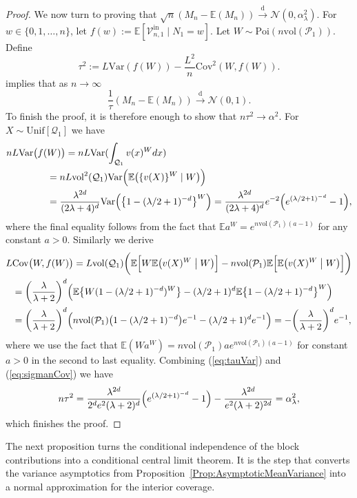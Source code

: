 \documentclass[11pt]{article}
\newcommand{\E}{\mathbb{E}}
\newcommand{\mQ}{\mathcal{Q}}
\newcommand{\vol}{\mathrm{vol}}
\newcommand{\var}{\mathrm{Var}}
\newcommand{\cov}{\mathrm{Cov}}
\newcommand{\dto}{\xrightarrow{\,\mathrm{d}\,} }
\begin{document}
\begin{proof}
We now turn to proving that $\sqrt{n}(M_n - \E(M_n))\dto \mathcal{N}(0, \alpha_\lambda^2)$. For $w\in \{0, 1, \ldots, n\}$, let $f(w) := \E[\mathcal{V}_{n, 1}^{\mathrm{in}}\mid N_1 = w]$. Let $W\sim\mathrm{Poi}(n\vol(\mathcal{P}_1))$. Define
\[
\tau^2 := L\var(f(W)) - \frac{L^2}{n}\cov^2(W, f(W)).
\]
\citet[Theorem~1]{holst1972asymptotic} implies that as $n \to \infty$
\[
\frac{1}{\tau}(M_n - \E(M_n)) \dto \mathcal{N}(0, 1). 
\]
To finish the proof, it is therefore enough to show that $n\tau^2\to \alpha^2$. For $X\sim\mathrm{Unif}[\mQ_1]$ we have
\begin{align}
    n L \var \bigl(f(&W)\bigr) = n L \var(\int_{\mQ_1}v(x)^W dx)\notag\\
    &= n L \vol^2(\mathcal{Q}_1)\var\Bigl(\E\bigl(\{v(X)\}^{W}\mid W\bigr)\Bigr) \notag \\
    &= \frac{\lambda^{2d}}{(2\lambda + 4)^{d}}\var\Bigl(\bigl\{1 - (\lambda/2 + 1)^{-d}\bigr\}^{W}\Bigr) 
    = \frac{\lambda^{2d}}{(2\lambda + 4)^{d}} e^{-2} \Bigl( e^{(\lambda/2 + 1)^{-d}} - 1\Bigr),\label{eq:tauVar} 
\end{align}
where the final equality follows from the fact that $\E a^W = e^{n\vol(\mathcal{P}_1)(a - 1)}$ for any constant $a > 0$. Similarly we derive
\begin{align}
L &\mathrm{Cov}\bigl(W, f(W)\bigr)= L\vol(\mathcal{Q}_1)\biggl(\E \Bigl[W \E\bigl(v(X)^{W}\bigm|W\bigr)\Bigr] -  n\vol(\mathcal{P}_1)\E\Bigl[\E\bigl(v(X)^{W}\bigm|W\bigr)\Bigr]\biggr) \notag \\ 
&=\biggl(\frac{\lambda}{\lambda + 2}\biggr)^d \Bigl(\E\bigl\{W(1 - (\lambda/2 + 1)^{-d})^{W}\bigr\} - (\lambda/2 + 1)^d \E\bigl\{1 - (\lambda/2 + 1)^{-d}\bigr\}^W\Bigr) \notag \\
&= \biggl(\frac{\lambda}{\lambda + 2}\biggr)^d\Bigl(n\vol(\mathcal{P}_1)\bigl(1 - (\lambda/2 + 1)^{-d}\bigr)e^{-1} 
 - (\lambda/2 + 1)^d e^{-1}\Bigr) = -\biggl(\frac{\lambda}{\lambda + 2}\biggr)^d e^{-1} \label{eq:sigmanCov},
\end{align}
where we use the fact that  $\E (W a^W) =  n\vol(\mathcal{P}_1) a e^{n\vol(\mathcal{P}_1)(a - 1)}$ for constant $a > 0$ in the second to last equality. Combining (\ref{eq:tauVar}) and (\ref{eq:sigmanCov}) we have 
\[
    n \tau^2 = \frac{\lambda^{2d}}{2^d e^{2}(\lambda + 2)^{d}}\Bigl(e^{(\lambda/2 + 1)^{-d}} - 1\Bigr) - \frac{\lambda^{2d}}{e^{2}(\lambda + 2)^{2d}} = \alpha_\lambda^2,  
\]
which finishes the proof.
\end{proof}

The next proposition turns the conditional independence of the block contributions into a conditional central limit theorem. It is the step that converts the variance asymptotics from Proposition~\ref{Prop:AsymptoticMeanVariance} into a normal approximation for the interior coverage.
\end{document}
